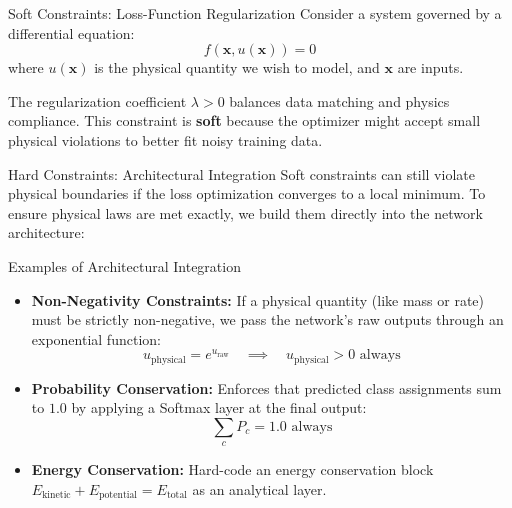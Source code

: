 \documentclass[9pt]{beamer}
\begin{document}
\begin{frame}{Soft Constraints: Loss-Function Regularization}
  Consider a system governed by a differential equation:
  $$f(\mathbf{x}, u(\mathbf{x})) = 0$$
  where $u(\mathbf{x})$ is the physical quantity we wish to model, and $\mathbf{x}$ are inputs.
  The regularization coefficient $\lambda > 0$ balances data matching and physics compliance. This constraint is \textbf{soft} because the optimizer might accept small physical violations to better fit noisy training data.
\end{frame}

\begin{frame}{Hard Constraints: Architectural Integration}
  Soft constraints can still violate physical boundaries if the loss optimization converges to a local minimum. To ensure physical laws are met exactly, we build them directly into the network architecture:
  \begin{block}{Examples of Architectural Integration}
    \begin{itemize}
      \item \textbf{Non-Negativity Constraints:} If a physical quantity (like mass or rate) must be strictly non-negative, we pass the network's raw outputs through an exponential function:
        $$u_{\text{physical}} = e^{u_{\text{raw}}} \quad \implies \quad u_{\text{physical}} > 0 \text{ always}$$
      \item \textbf{Probability Conservation:} Enforces that predicted class assignments sum to $1.0$ by applying a Softmax layer at the final output:
        $$\sum_c P_c = 1.0 \text{ always}$$
      \item \textbf{Energy Conservation:} Hard-code an energy conservation block $E_{\text{kinetic}} + E_{\text{potential}} = E_{\text{total}}$ as an analytical layer.
    \end{itemize}
  \end{block}
\end{frame}
\end{document}
